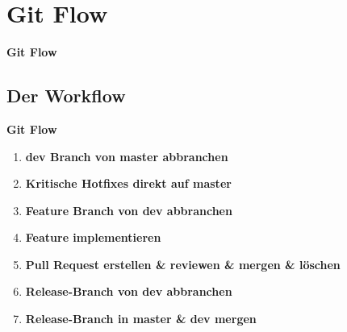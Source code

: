 \section{Git Flow}\label{sec:github-flow}
\begin{frame}[c]
    \centering
    \Large
    \textbf{Git Flow}
\end{frame}

\subsection{Der Workflow}\label{subsec:der-workflow}
\begin{frame}[c]
    \slidehead
    \centering
    \large
    \textbf{Git Flow}
    \vspace{1em}
    \begin{enumerate}[<+->]
        \item \textbf{dev Branch von master abbranchen}
        \item \textbf{Kritische Hotfixes direkt auf master}
        \item \textbf{Feature Branch von dev abbranchen}
        \item \textbf{Feature implementieren}
        \item \textbf{Pull Request erstellen \& reviewen \& mergen \& löschen}
        \item \textbf{Release-Branch von dev abbranchen}
        \item \textbf{Release-Branch in master \& dev mergen}
    \end{enumerate}
\end{frame}

